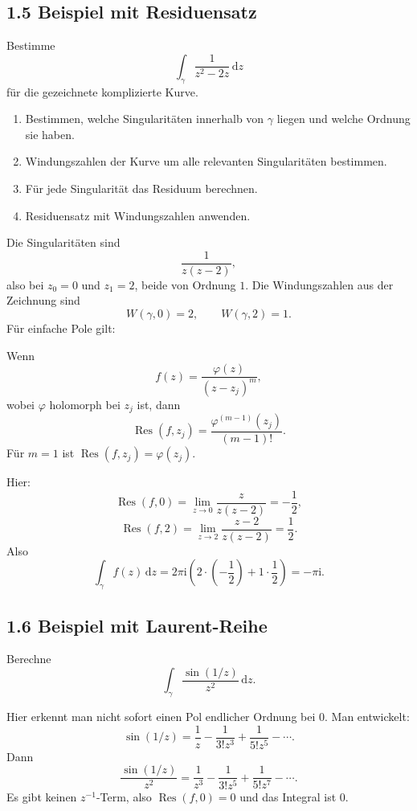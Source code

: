\documentclass[11pt,a4paper]{article}
\newcommand{\ii}{\mathrm i}
\newcommand{\dd}{\,\mathrm d}
\newcommand{\Res}{\operatorname{Res}}
\begin{document}
\subsection{1.5 Beispiel mit Residuensatz}
\begin{beispielbox}
Bestimme
\[
\int_\gamma \frac{1}{z^2-2z}\dd z
\]
für die gezeichnete komplizierte Kurve.
\end{beispielbox}
\begin{kochrezeptbox}
\begin{enumerate}[label=\Roman*.]
\item Bestimmen, welche Singularitäten innerhalb von $\gamma$ liegen und welche Ordnung sie haben.
\item Windungszahlen der Kurve um alle relevanten Singularitäten bestimmen.
\item Für jede Singularität das Residuum berechnen.
\item Residuensatz mit Windungszahlen anwenden.
\end{enumerate}
\end{kochrezeptbox}
Die Singularitäten sind
\[
\frac1{z(z-2)},
\]
also bei $z_0=0$ und $z_1=2$, beide von Ordnung $1$.
Die Windungszahlen aus der Zeichnung sind
\[
W(\gamma,0)=2,
\qquad W(\gamma,2)=1.
\]
Für einfache Pole gilt:
\begin{importantbox}
Wenn
\[
f(z)=\frac{\varphi(z)}{(z-z_j)^m},
\]
wobei $\varphi$ holomorph bei $z_j$ ist, dann
\[
\Res(f,z_j)=\frac{\varphi^{(m-1)}(z_j)}{(m-1)!}.
\]
Für $m=1$ ist $\Res(f,z_j)=\varphi(z_j)$.
\end{importantbox}

Hier:
\[
\Res(f,0)=\lim_{z\to0}\frac{z}{z(z-2)}=-\frac12,
\]
\[
\Res(f,2)=\lim_{z\to2}\frac{z-2}{z(z-2)}=\frac12.
\]
Also
\[
\int_\gamma f(z)\dd z
=2\pi\ii\left(2\cdot\left(-\frac12\right)+1\cdot\frac12\right)
=-\pi\ii.
\]

\subsection{1.6 Beispiel mit Laurent-Reihe}
\begin{beispielbox}
Berechne
\[
\int_\gamma \frac{\sin(1/z)}{z^2}\dd z.
\]
\end{beispielbox}
Hier erkennt man nicht sofort einen Pol endlicher Ordnung bei $0$. Man entwickelt:
\[
\sin(1/z)=\frac1z-\frac1{3!z^3}+\frac1{5!z^5}-\cdots.
\]
Dann
\[
\frac{\sin(1/z)}{z^2}=\frac1{z^3}-\frac1{3!z^5}+\frac1{5!z^7}-\cdots.
\]
Es gibt keinen $z^{-1}$-Term, also $\Res(f,0)=0$ und das Integral ist $0$.
\end{document}
